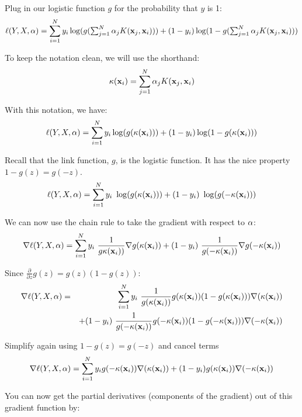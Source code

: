 \documentclass[11pt]{article}
\newcommand{\va}{{\bf \alpha}}
\newcommand{\vx}{{\bf x}}
\newcommand{\vxi}{{\bf x}_i}
\begin{document}
Plug in our logistic function $g$ for the probability that $y$ is 1:
\begin{equation}
\ell(Y,X,\va) = \sum_{i=1}^N{ y_i \log( g(\textstyle\sum_{j=1}^N \alpha_j K(\vx_j, \vx_i) ) ) + (1-y_i) \log( 1-g(\textstyle\sum_{j=1}^N \alpha_j K(\vx_j, \vx_i) ) )}
\end{equation}

To keep the notation clean, we will use the shorthand:
\begin{equation}
\kappa(\vxi) = \sum_{j=1}^N \alpha_j K(\vx_j, \vx_i)
\end{equation}

With this notation, we have:
\begin{equation}
\ell(Y,X,\va) = \sum_{i=1}^N{ y_i \log( g(\kappa(\vxi)  ) ) + (1-y_i) \log( 1-g(\kappa(\vxi)  ) )}
\end{equation}

Recall that the link function, $g$, is the logistic function. It has the nice property $1 - g(z) = g(-z)$.
\begin{equation}
\ell(Y,X,\va) = \sum_{i=1}^N{ y_i\ \log( g(\kappa(\vxi) ) ) + (1-y_i)\ \log( g(-\kappa(\vxi) ) )}
\end{equation}

We can now use the chain rule to take the gradient with respect to $\va$:
\begin{equation}
\nabla \ell(Y,X,\va) = \sum_{i=1}^N 
	y_i\ \frac{1}{g\kappa(\vxi) )} \nabla g(\kappa(\vxi) ) 
	 + (1-y_i)\ \frac{1}{g(-\kappa(\vxi))} \nabla g(-\kappa(\vxi)) 
\end{equation}

Since $\frac{\partial}{\partial z}g(z) = g(z)(1-g(z))$:
\begin{eqnarray}
\nabla \ell(Y,X,\va) &=& \sum_{i=1}^N 
	 y_i\ \frac{1}{g(\kappa(\vxi) )} g(\kappa(\vxi)) (1-g(\kappa(\vxi) )) \nabla (\kappa(\vxi)) \\
& & 	+ (1-y_i)\ \frac{1}{g(-\kappa(\vxi) )} g(-\kappa(\vxi) ) (1-g(-\kappa(\vxi) )) \nabla (-\kappa(\vxi) )
\end{eqnarray}

Simplify again using $1-g(z) = g(-z)$ and cancel terms
\begin{equation}
\nabla \ell(Y,X,\va) = \sum_{i=1}^N{
	y_i g(-\kappa(\vxi) ) \nabla(\kappa(\vxi) )
	+ (1-y_i) g(\kappa(\vxi) ) \nabla (-\kappa(\vxi) )
}
\end{equation}

You can now get the partial derivatives (components of the gradient) out of this gradient function by:
\end{document}
